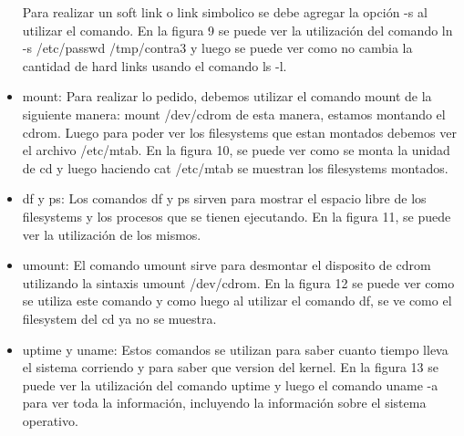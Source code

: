 \documentclass[a4paper, 12pt]{article}
\begin{document}
\begin{itemize}
Para realizar un soft link o link simbolico se debe agregar la opci\'on -s al utilizar el comando. En la figura 9 se puede ver la utilizaci\'on del comando ln -s /etc/passwd /tmp/contra3 y luego se puede ver como no cambia la cantidad de hard links usando el comando ls -l.

\item mount: Para realizar lo pedido, debemos utilizar el comando mount de la siguiente manera: mount /dev/cdrom de esta manera, estamos montando el cdrom. Luego para poder ver los filesystems que estan montados debemos ver el archivo /etc/mtab. En la figura 10, se puede ver como se monta la unidad de cd y luego haciendo cat /etc/mtab se muestran los filesystems montados.

\item df y ps: Los comandos df y ps sirven para mostrar el espacio libre de los filesystems y los procesos que se tienen ejecutando. En la figura 11, se puede ver la utilizaci\'on de los mismos.

\item umount: El comando umount sirve para desmontar el disposito de cdrom utilizando la sintaxis umount /dev/cdrom. En la figura 12 se puede ver como se utiliza este comando y como luego al utilizar el comando df, se ve como el filesystem del cd ya no se muestra.

\item uptime y uname: Estos comandos se utilizan para saber cuanto tiempo lleva el sistema corriendo y para saber que version del kernel. En la figura 13 se puede ver la utilizaci\'on del comando uptime y luego el comando uname -a para ver toda la informaci\'on, incluyendo la informaci\'on sobre el sistema operativo.

\end{itemize}
\end{document}
